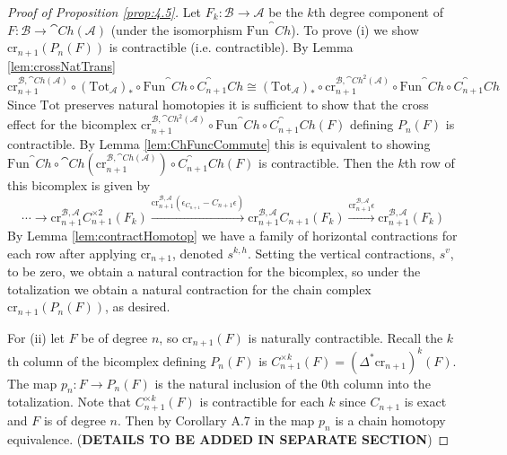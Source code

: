 \begin{proof}[Proof of Proposition \ref{prop:4.5}]
    Let $F_k:\mathcal{B}\rightarrow \mathcal{A}$ be the $k$th degree component of $F:\mathcal{B}\rightarrow \cat{Ch}(\mathcal{A})$ (under the isomorphism $\text{Fun}^\cat{Ch}$). To prove (i) we show $\text{cr}_{n+1}(P_n(F))$ is contractible (i.e.  contractible). By Lemma \ref{lem:crossNatTrans} 
    \begin{equation*}
        \text{cr}_{n+1}^{\mathcal{B},\cat{Ch}(\mathcal{A})}\circ (\text{Tot}_\mathcal{A})_*\circ \text{Fun}^\cat{Ch}\circ C_{n+1}^\cat{Ch} \cong (\text{Tot}_\mathcal{A})_*\circ \text{cr}_{n+1}^{\mathcal{B},\cat{Ch}^2(\mathcal{A})}\circ \text{Fun}^\cat{Ch}\circ C_{n+1}^\cat{Ch}
    \end{equation*}
    Since $\text{Tot}$ preserves natural homotopies it is sufficient to show that the cross effect for the bicomplex $\text{cr}_{n+1}^{\mathcal{B},\cat{Ch}^2(\mathcal{A})}\circ \text{Fun}^\cat{Ch}\circ C_{n+1}^\cat{Ch}(F)$ defining $P_n(F)$ is contractible. By Lemma \ref{lem:ChFuncCommute} this is equivalent to showing $\text{Fun}^\cat{Ch}\circ\cat{Ch}(\text{cr}_{n+1}^{\mathcal{B},\cat{Ch}(\mathcal{A})})\circ C_{n+1}^\cat{Ch}(F)$ is contractible. Then the $k$th row of this bicomplex is given by
    \begin{equation*}
        \cdots \rightarrow\text{cr}_{n+1}^{\mathcal{B},\mathcal{A}}C_{n+1}^{\times2}(F_k)\xrightarrow{\text{cr}_{n+1}^{\mathcal{B},\mathcal{A}}(\epsilon_{C_{n+1}}-C_{n+1}\epsilon)}\text{cr}_{n+1}^{\mathcal{B},\mathcal{A}}C_{n+1}(F_k)\xrightarrow{\text{cr}_{n+1}^{\mathcal{B},\mathcal{A}}\epsilon}\text{cr}_{n+1}^{\mathcal{B},\mathcal{A}}(F_k)
    \end{equation*}
    By Lemma \ref{lem:contractHomotop} we have a family of horizontal contractions for each row after applying $\text{cr}_{n+1}$, denoted $s^{k,h}$. Setting the vertical contractions, $s^v$, to be zero, we obtain a natural contraction for the bicomplex, so under the totalization we obtain a natural contraction for the chain complex $\text{cr}_{n+1}(P_n(F))$, as desired. 

    \vspace{10pt}

    For (ii) let $F$ be of degree $n$, so $\text{cr}_{n+1}(F)$ is naturally contractible. Recall the $k$th column of the bicomplex defining $P_n(F)$ is $C_{n+1}^{\times k}(F) = (\Delta^*\text{cr}_{n+1})^k(F)$. The map $p_n:F\rightarrow P_n(F)$ is the natural inclusion of the $0$th column into the totalization. Note that $C_{n+1}^{\times k}(F)$ is contractible for each $k$ since $C_{n+1}$ is exact and $F$ is of degree $n$. Then by Corollary A.7 in \cite{BJORT} the map $p_n$ is a  chain homotopy equivalence. (\textbf{DETAILS TO BE ADDED IN SEPARATE SECTION})


\end{proof}
